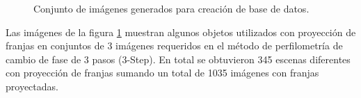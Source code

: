 \documentclass[10pt,letterpaper]{article}
\begin{document}
\begin{figure}[H]
\begin{center}
{            \label{tif44}}
        \caption{Conjunto de imágenes generados para creación de base de datos.}
        \label{imagenesBasedata}
      \end{center}
    \end{figure}
    
Las imágenes de la figura \ref{imagenesBasedata} muestran algunos objetos utilizados con proyección de franjas en conjuntos de 3 imágenes requeridos en el método de perfilometría de cambio de fase de 3 pasos (3-Step). En total se obtuvieron 345 escenas diferentes con proyección de franjas sumando un total de 1035 imágenes con franjas proyectadas.
\end{document}
